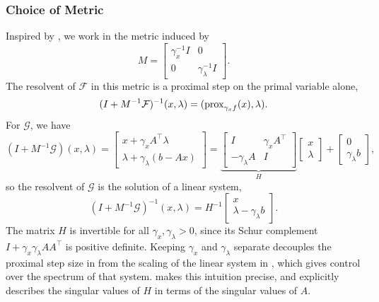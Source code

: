 \documentclass[11pt]{article}
\begin{document}
\subsubsection{Choice of Metric}
Inspired by \citet{alves2025generalframeworkinexactsplitting}, we work in the metric induced by
\begin{equation*}
    M = \begin{bmatrix}
    \gamma_x^{-1} I & 0 \\ 0 & \gamma_\lambda^{-1} I
    \end{bmatrix}.
\end{equation*}
The resolvent of $\mathcal{F}$ in this metric is a proximal step on the primal variable alone,
\begin{equation}\label{eq:f-resolvent}
    (I+M^{-1}\mathcal{F})^{-1}(x,\lambda) = (\mathrm{prox}_{\gamma_x f}(x), \lambda).
\end{equation}
For $\mathcal{G}$, we have
\begin{equation}\label{eq:g-forward-step}
    (I + M^{-1}\mathcal{G})(x,\lambda) = \begin{bmatrix} x + \gamma_x A^\top\lambda \\ \lambda + \gamma_\lambda(b-Ax)
    \end{bmatrix} = \underbrace{\begin{bmatrix}
        I & \gamma_x A^\top \\ -\gamma_\lambda A & I
    \end{bmatrix}}_{H}\begin{bmatrix}
        x \\ \lambda
    \end{bmatrix} + \begin{bmatrix}
        0 \\ \gamma_\lambda b
    \end{bmatrix},
\end{equation}
so the resolvent of $\mathcal{G}$ is the solution of a linear system,
\begin{equation}\label{eq:g-resolvent}
    (I + M^{-1}\mathcal{G})^{-1}(x,\lambda) = H^{-1}\begin{bmatrix}
        x \\ \lambda - \gamma_\lambda b
    \end{bmatrix}.
\end{equation}
The matrix $H$ is invertible for all $\gamma_x, \gamma_\lambda > 0$, since its Schur complement $I + \gamma_x\gamma_\lambda AA^\top$ is positive definite.
Keeping $\gamma_x$ and $\gamma_\lambda$ separate decouples the proximal step size in  from the scaling of the linear system in , which gives control over the spectrum of that system.
 makes this intuition precise, and  explicitly describes the singular values of $H$ in terms of the singular values of $A$.
\end{document}
